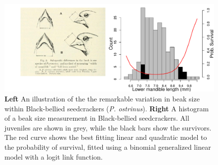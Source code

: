 \begin{figure}
\begin{center}
\includegraphics[width= \textwidth]{Journal_figs/Quant_gen/Smith_black_bellied_seed_cracker/Smith_black_bellied.pdf}
\end{center}
\caption{ {\bf Left} An illustration of the the remarkable variation
  in beak size within Black-bellied seedcrackers ({\it  P.
    ostrinus}). {\bf Right} A histogram of a beak size measurement in
  Black-bellied seedcrackers. All juveniles are shown in grey, while the
  black bars show the survivors. The red curve shows the best fitting
  linear and quadratic model to the probability of survival, fitted
  using a binomial generalized linear model with a logit link function.  
     } \label{Black_bellied_seedcrackers_beaks}
\end{figure}


